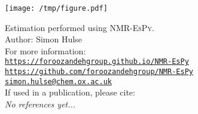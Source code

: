 \documentclass[8pt]{article}
\begin{document}
\begin{center}
\texttt{[image: /tmp/figure.pdf]}
\end{center}

\small
\begin{tcolorbox}[hbox]
\begin{varwidth}{\textwidth}
Estimation performed using \textsc{NMR-EsPy}.\\
Author: Simon Hulse\\
For more information:\\[5pt]
{}\hspace{1em}\href{https://foroozandehgroup.github.io/NMR-EsPy}{\texttt{https://foroozandehgroup.github.io/NMR-EsPy}}\\[5pt]
{}\hspace{1em}\href{https://github.com/foroozandehgroup/NMR-EsPy}{\texttt{https://github.com/foroozandehgroup/NMR-EsPy}}\\[5pt]
{}\hspace{1em}\href{mailto:simon.hulse@chem.ox.ac.uk?subject=NMR-EsPy query}{\texttt{simon.hulse@chem.ox.ac.uk}}\\[5pt]
If used in a publication, please cite:\\
\textit{No references yet...}
\end{varwidth}
\end{tcolorbox}
\end{document}
